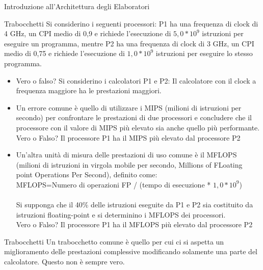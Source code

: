 \documentclass[11pt]{article}
\begin{document}
\begin{quiz}{Introduzione all'Architettura degli Elaboratori}
\begin{cloze}[points=1,shuffle=true]{Trabocchetti}
Si considerino i seguenti processori: P1 ha una frequenza di clock di 4 GHz, un CPI medio di 0,9 e richiede l’esecuzione di $5,0*10^9$ istruzioni per eseguire un programma, mentre P2 ha una frequenza di clock di 3 GHz, un CPI medio di 0,75 e richiede l’esecuzione di $1,0*10^9$ istruzioni per eseguire lo stesso programma.
\begin{itemize}
\item Vero o falso? Si considerino i calcolatori P1 e P2: Il calcolatore con il clock a frequenza maggiore ha le prestazioni maggiori.
%
\item Un errore comune è quello di utilizzare i MIPS (milioni di istruzioni per secondo) per confrontare le prestazioni di due processori e concludere che il processore con il valore di MIPS più elevato sia anche quello più performante.\\
Vero o Falso? Il processore P1 ha il MIPS più elevato dal processore P2
%
\item Un'altra unità di misura delle prestazioni di uso comune è il MFLOPS (milioni di istruzioni in virgola mobile per secondo, Millions of FLoating point Operations Per Second), definito come:\\
MFLOPS=Numero di operazioni FP / (tempo di esecuzione * $1,0*10^9$)\\
\\
Si supponga che il 40\% delle istruzioni eseguite da P1 e P2 sia costituito da istruzioni floating-point e si determinino i MFLOPS dei processori.\\
Vero o Falso? Il processore P1 ha il MFLOPS più elevato dal processore P2
\end{itemize}
\end{cloze}

\begin{cloze}[points=1,shuffle=true]{Trabocchetti}
Un trabocchetto comune è quello per cui ci si aspetta un miglioramento delle prestazioni complessive modificando solamente una parte del calcolatore. Questo non è sempre vero.


\end{cloze}
\end{quiz}
\end{document}
